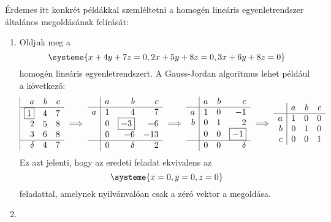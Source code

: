 \documentclass[9pt, showtrims]{memoir}
\theoremstyle{plain}
\theoremstyle{remark}
\theoremstyle{definition}
\begin{document}
Érdemes itt konkrét példákkal szemléltetni a homogén lineáris egyenletrendszer általános megoldásának felírását:
\begin{enumerate}
    \item 
        Oldjuk meg a 
        \[
            \systeme{ x+4y+7z=0,
                2x+5y+8z=0,
                3x+6y+8z=0
            }
        \]
        homogén  lineáris egyenletrendszert.
        A Gauss-Jordan algoritmus lehet például a következő:
        \[
            \begin{array}{|rrr}
                a&b&c\\
                \hline
                \boxed{1}&4&7\\
                2&5&8\\
                3&6&8\\
                \hline
                \delta&4&7
            \end{array}
            \implies
            \begin{array}{r|rrr}
                &a&b&c\\
                \hline
                a &  1&4&7\\
                &  0&\boxed{-3}&-6\\
                &  0&-6&-13\\
                \hline
                &  0&\delta&2
            \end{array}
            \implies
            \begin{array}{r|rrr}
                &a&b&c\\
                \hline
                a &  1&0&-1\\
                b &  0&1&2\\
                &  0&0&\boxed{-1}\\
                \hline
                &  0&0&\delta
            \end{array}
            \implies
            \begin{array}{r|rrr}
                &a&b&c\\
                \hline
                a &  1&0&0\\
                b &  0&1&0\\
                c &  0&0&1
            \end{array}
        \]
        Ez azt jelenti, hogy az eredeti feladat ekvivalens az
        \[\systeme{x=0,y=0,z=0}\]
        feladattal, amelynek nyilvánvalóan csak a zéró vektor a megoldása.
    \item

\end{enumerate}
\end{document}
